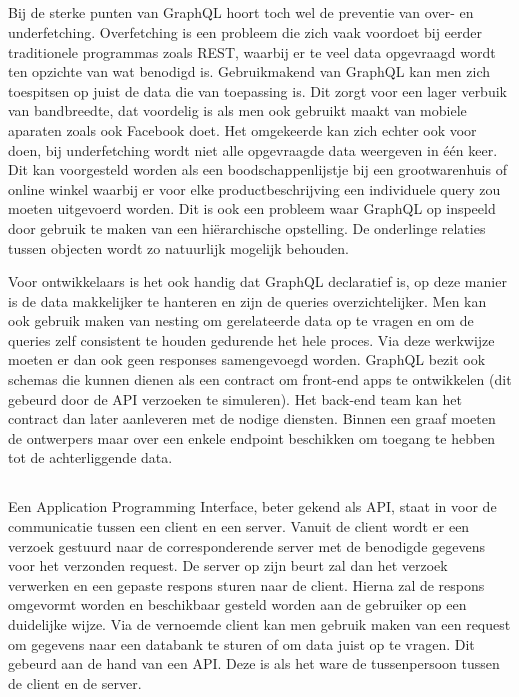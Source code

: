 \subsection{}%
\label{sec:Gebruik}
Bij de sterke punten van GraphQL hoort toch wel de preventie van over- en underfetching. Overfetching is een probleem die zich vaak voordoet bij eerder traditionele programmas zoals REST, waarbij er te veel data opgevraagd wordt ten opzichte van wat benodigd is. Gebruikmakend van GraphQL kan men zich toespitsen op juist de data die van toepassing is. Dit zorgt voor een lager verbuik van bandbreedte, dat voordelig is als men ook gebruikt maakt van mobiele aparaten zoals ook Facebook doet. Het omgekeerde kan zich echter ook voor doen, bij underfetching wordt niet alle opgevraagde data weergeven in één keer. Dit kan voorgesteld worden als een boodschappenlijstje bij een grootwarenhuis of online winkel waarbij er voor elke productbeschrijving een individuele query zou moeten uitgevoerd worden. Dit is ook een probleem waar GraphQL op inspeeld door gebruik te maken van een hiërarchische opstelling. De onderlinge relaties tussen objecten wordt zo natuurlijk mogelijk behouden. \autocite{Byron2015}

Voor ontwikkelaars is het ook handig dat GraphQL declaratief is, op deze manier is de data makkelijker te hanteren en zijn de queries overzichtelijker. Men kan ook gebruik maken van nesting om gerelateerde data op te vragen en om de queries zelf consistent te houden gedurende het hele proces. Via deze werkwijze moeten er dan ook geen responses samengevoegd worden. GraphQL bezit ook schemas die kunnen dienen als een contract om front-end apps te ontwikkelen (dit gebeurd door de API verzoeken te simuleren). Het back-end team kan het contract dan later aanleveren met de nodige diensten. Binnen een graaf moeten de ontwerpers maar over een enkele endpoint beschikken om toegang te hebben tot de achterliggende data.

\subsection{}%
\label{sec:API}
Een Application Programming Interface, beter gekend als API, staat in voor de communicatie tussen een client en een server. Vanuit de client wordt er een verzoek gestuurd naar de corresponderende server met de benodigde gegevens voor het verzonden request. De server op zijn beurt zal dan het verzoek verwerken en een gepaste respons sturen naar de client. Hierna zal de respons omgevormt worden en beschikbaar gesteld worden aan de gebruiker op een duidelijke wijze. Via de vernoemde client kan men gebruik maken van een request om gegevens naar een databank te sturen of om data juist op te vragen. Dit gebeurd aan de hand van een API. Deze is als het ware de tussenpersoon tussen de client en de server. \autocite{Willem2021}
